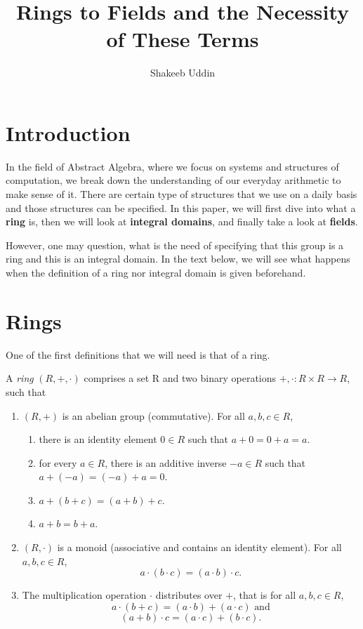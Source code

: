 \documentclass{article}
\title{Rings to Fields and the Necessity of These Terms}
\author{Shakeeb Uddin}\date{}
\begin{document}
\maketitle



\section*{Introduction}


In the field of Abstract Algebra, where we focus on systems and structures of computation, we break down the understanding of our everyday arithmetic to make sense of it. There are certain type of structures that we use on a daily basis and those structures can be specified. In this paper, we will first dive into what a \textbf{ring} is, then we will look at \textbf{integral domains}, and finally take a look at \textbf{fields}. 

However, one may question, what is the need of specifying that this group is a ring and this is an integral domain. In the text below, we will see what happens when the definition of a ring nor integral domain is given beforehand.

\section{Rings}

One of the first definitions that we will need is that of a ring.

\begin{definition}\label{def:Ring}
    A \emph{ring} $(R, +, \cdot)$ comprises a set R and two binary operations $+, \cdot:R\times R \rightarrow R$, such that
    \begin{enumerate}
        \item $(R, +)$ is an abelian group (commutative). For all $a,b,c \in R$,
            \begin{enumerate}
                \item there is an identity element $0 \in R$ such that $a+0=0+a=a$.
                \item for every $a \in R$, there is an additive inverse $-a \in R$ such that $a+(-a) = (-a)+a=0$.
                \item $a+(b+c)=(a+b)+c$.
                \item $a+b=b+a$.
            \end{enumerate}
        \item $(R, \cdot)$ is a monoid (associative and contains an identity element). For all $a,b,c \in R$,
            \[
                a \cdot (b \cdot c) = (a \cdot b) \cdot c.
            \]
        \item The multiplication operation $\cdot$ distributes over $+$, that is for all $a,b,c \in R$,
            \[
                a \cdot (b + c) = (a \cdot b) + (a \cdot c) \text{ and}
             \]
             \[
                (a + b) \cdot c = (a \cdot c) + (b \cdot c).
             \]
    \end{enumerate}
\end{definition} \cite{AdvancedMath} \\
\end{document}
